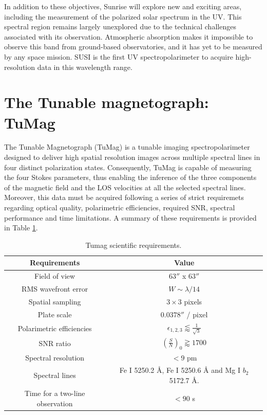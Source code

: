 In addition to these objectives, Sunrise will explore new and exciting areas, including the measurement of the polarized solar spectrum in the UV. This spectral region remains largely unexplored due to the technical challenges associated with its observation. Atmospheric absorption makes it impossible to observe this band from ground-based observatories, and it has yet to be measured by any space mission. SUSI is the first UV spectropolarimeter to acquire high-resolution data in this wavelength range.

\section{The Tunable magnetograph: TuMag}

The Tunable Magnetograph (TuMag) is a tunable imaging spectropolarimeter designed to deliver high spatial resolution images across multiple spectral lines in four distinct polarization states. Consequently, TuMag is capable of measuring the four Stokes parameters, thus enabling the inference of the three components of the magnetic field and the LOS velocities at all the selected spectral lines. Moreover, this data must be acquired following a series of strict requiremets regarding optical quality, polarimetric efficiencies, required SNR, spectral performance and time limitations. A summary of these requirements is provided in Table \ref{table: Tumags requirements}. 

\begin{table}
    \centering
   \begin{tabular}{cc}
    \hline
    \hline
    Requirements & Value \\
    \hline
    Field of view & $63''$ x $63''$ \\
    RMS wavefront error & $W \sim \lambda / 14$\\
    Spatial sampling & $3 \times 3 $ pixels \\
    Plate scale & $0.0378''$ / pixel \\
    Polarimetric efficiencies & $\epsilon _ {1, 2, 3} \lessapprox \frac{1}{\sqrt{3}}$\\
    SNR ratio & $\left(\frac{S}{N}\right) _ 0 \gtrapprox 1700$ \\
    Spectral resolution & $< 9$ pm\\  
    Spectral lines & Fe I 5250.2 \r{A}, Fe I 5250.6 \r{A} and Mg I $b_2$ 5172.7 \r{A}. \\
    Time for a two-line observation & $< 90$ s\\
    \hline
    \hline
    \end{tabular}
    \caption{Tumag scientific requirements.}
    \label{table: Tumags requirements}
\end{table}

